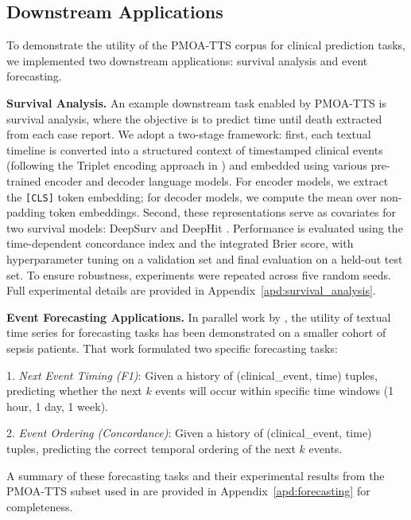 \subsection{Downstream Applications}

To demonstrate the utility of the PMOA-TTS corpus for clinical prediction tasks, we implemented two downstream applications: survival analysis and event forecasting.

\textbf{Survival Analysis.}
An example downstream task enabled by PMOA-TTS is survival analysis, where the objective is to predict time until death extracted from each case report. 
We adopt a two-stage framework: first, each textual timeline is converted into a structured context of timestamped clinical events (following the Triplet encoding approach in \cite{oufattolemeds}) and embedded using various pre-trained encoder and decoder language models. 
For encoder models, we extract the \texttt{[CLS]} token embedding; for decoder models, we compute the mean over non-padding token embeddings. Second, these representations serve as covariates for two survival models: DeepSurv \citep{katzman2018deepsurv} and DeepHit \citep{lee2018deephit}. 
Performance is evaluated using the time-dependent concordance index \citep{antolini2005time} and the integrated Brier score, with hyperparameter tuning on a validation set and final evaluation on a held-out test set. 
To ensure robustness, experiments were repeated across five random seeds. Full experimental details are provided in Appendix~\ref{apd:survival_analysis}.

\textbf{Event Forecasting Applications.}
In parallel work by \cite{noroozizadeh2025forecasting}, the utility of textual time series for forecasting tasks has been demonstrated on a smaller cohort of sepsis patients. 
That work formulated two specific forecasting tasks: 

1. \emph{Next Event Timing (F1)}: Given a history of (clinical\_event, time) tuples, predicting whether the next \(k\) events will occur within specific time windows (1 hour, 1 day, 1 week).

2. \emph{Event Ordering (Concordance)}: Given a history of (clinical\_event, time) tuples, predicting the correct temporal ordering of the next \(k\) events.

A summary of these forecasting tasks and their experimental results from the PMOA-TTS subset used in \cite{noroozizadeh2025forecasting} are provided in Appendix~\ref{apd:forecasting} for completeness.






